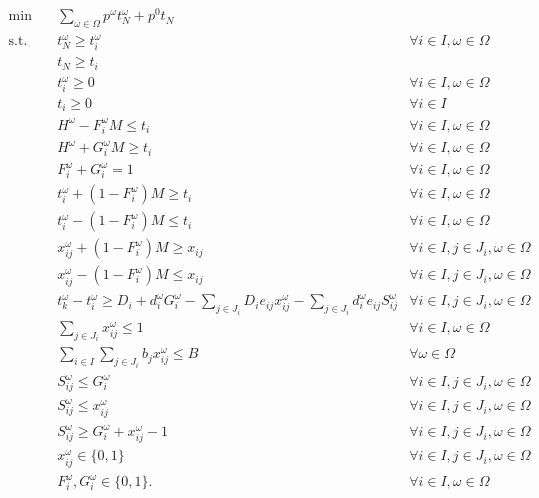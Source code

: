 \documentclass[11pt]{article}
\begin{document}
	\begin{subequations} \label{prob:extensive}
		\begin{align}
			\min \quad & \sum_{\omega \in \Omega} p^\omega t_N^\omega + p^0 t_N& \\
			\text{s.t.} \quad & t_N^\omega \geq t_i^\omega & \forall i \in I, \omega \in \Omega \\
			& t_N \geq t_i & \label{cons:tN}\\
			& t_i^\omega \geq 0 & \forall i \in I, \omega \in \Omega\\
			& t_i \geq 0 & \forall i \in I\\
			& H^\omega - F_i^\omega M \leq t_i & \forall i \in I, \omega \in \Omega \label{cons:F}\\
			& H^\omega + G_i^\omega M \geq t_i & \forall i \in I, \omega \in \Omega \label{cons:G}\\
			& F_i^\omega + G_i^\omega = 1 & \forall i \in I, \omega \in \Omega \label{cons:FG}\\
			& t_i^\omega + (1 - F_i^\omega)M \geq t_i & \forall i \in I, \omega \in \Omega \label{cons:tF1}\\
			& t_i^\omega - (1 - F_i^\omega)M \leq t_i & \forall i \in I, \omega \in \Omega \label{cons:tF2}\\
			& x_{ij}^\omega + (1 - F_i^\omega)M \geq x_{ij} & \forall i \in I, j \in J_i, \omega \in \Omega \label{cons:xF1}\\
			& x_{ij}^\omega - (1 - F_i^\omega)M \leq x_{ij} & \forall i \in I, j \in J_i, \omega \in \Omega \label{cons:xF2}\\
			& t_k^\omega - t_i^\omega \geq D_i + d_i^\omega G_i^\omega -\sum_{j \in J_i} D_i e_{ij} x_{ij}^\omega - \sum_{j \in J_i} d_i^\omega e_{ij} S_{ij}^\omega & \forall i \in I, j \in J_i, \omega \in \Omega \label{cons:duration}\\
			& \sum_{j \in J_i} x_{ij}^\omega \leq 1 & \forall i \in I, \omega \in \Omega \label{cons:crashLim}\\
			& \sum_{i \in I}\sum_{j \in J_i} b_jx_{ij}^\omega \leq B & \forall \omega \in \Omega \label{cons:budget}\\
			& S_{ij}^\omega \leq G_i^\omega & \forall i \in I, j \in J_i, \omega \in \Omega \label{cons:linearize1}\\
			& S_{ij}^\omega \leq x_{ij}^\omega & \forall i \in I, j \in J_i, \omega \in \Omega \label{cons:linearize2}\\
			& S_{ij}^\omega \geq G_i^\omega + x_{ij}^\omega - 1 & \forall i \in I, j \in J_i, \omega \in \Omega \label{cons:linearize3}\\
			& x_{ij}^\omega \in \{0,1\} & \forall i \in I, j \in J_i, \omega \in \Omega\\
			& F_i^\omega, G_i^\omega \in \{0,1\}. & \forall i \in I, \omega \in \Omega
		\end{align}
	\end{subequations}
	
\end{document}
